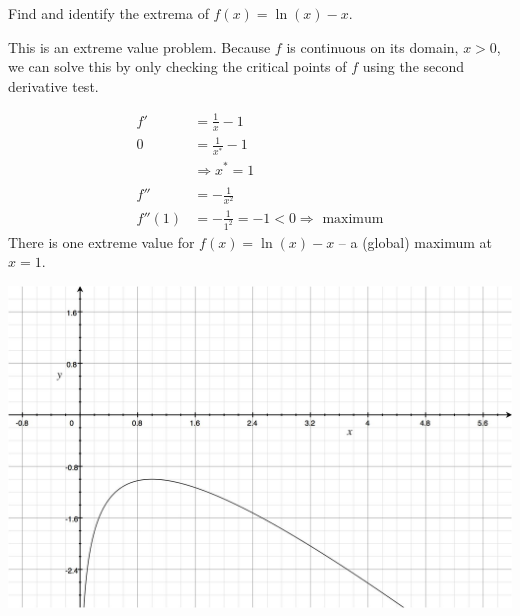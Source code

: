 \documentclass{ximera}
\author{Emma Smith Zbarsky}
\begin{document}
\begin{exercise}

Find and identify the extrema of $f(x) = \ln(x)-x.$


\begin{hint}
This is an extreme value problem. Because $f$ is continuous on its
domain, $x>0$, we can solve this by only checking the critical points of
$f$ using the second derivative test.
\end{hint}


\begin{hint}
\begin{align*}
f' &= \frac{1}{x}-1 \\
0 &= \frac{1}{x^*}-1 \\
& \Rightarrow x^* = 1 \\
&\\
f'' &= -\frac{1}{x^2} \\
f''(1) &= -\frac{1}{1^2} = -1 <0 \Rightarrow \mbox{ maximum}
\end{align*} There is one extreme value for $f(x) = \ln(x)-x$ -- a
(global) maximum at $x=1$. 

\begin{image}\includegraphics[width=.5\textwidth]{extremalnx-x.jpg}\end{image}
\end{hint}


\begin{multipleChoice}
\end{multipleChoice}

\end{exercise}
\end{document}
